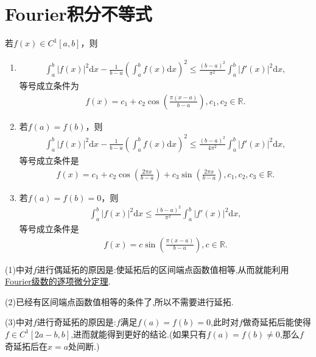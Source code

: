 \documentclass[../../main.tex]{subfiles}
\begin{document}
\section{Fourier积分不等式}

\begin{theorem}[Fourier型积分不等式]\label{theorem:Fourier型积分不等式}
若$f(x)\in C^1[a,b]$，则
\begin{enumerate}[(1)]
\item \begin{align*}
\int_{a}^{b} |f(x)|^2 \mathrm{d}x - \frac{1}{b - a} \left( \int_{a}^{b} f(x) \mathrm{d}x \right)^2 \leqslant  \frac{(b - a)^2}{\pi^2} \int_{a}^{b} |f'(x)|^2 \mathrm{d}x,
\end{align*}
等号成立条件为
\begin{align*}
f(x) = c_1 + c_2 \cos\left( \frac{\pi(x - a)}{b - a} \right), c_1, c_2 \in \mathbb{R}.
\end{align*}

\item 若$f(a) = f(b)$，则
\begin{align*}
\int_{a}^{b} |f(x)|^2 \mathrm{d}x - \frac{1}{b - a} \left( \int_{a}^{b} f(x) \mathrm{d}x \right)^2 \leqslant  \frac{(b - a)^2}{4\pi^2} \int_{a}^{b} |f'(x)|^2 \mathrm{d}x,
\end{align*}
等号成立条件是
\begin{align*}
f(x) = c_1 + c_2 \cos\left( \frac{2\pi x}{b - a} \right) + c_3 \sin\left( \frac{2\pi x}{b - a} \right), c_1, c_2, c_3 \in \mathbb{R}.
\end{align*}

\item 若$f(a) = f(b) = 0$，则
\begin{align*}
\int_{a}^{b} |f(x)|^2 \mathrm{d}x \leqslant  \frac{(b - a)^2}{\pi^2} \int_{a}^{b} |f'(x)|^2 \mathrm{d}x,
\end{align*}
等号成立条件是
\begin{align*}
f(x) = c \sin\left( \frac{\pi (x - a)}{b - a} \right), c \in \mathbb{R}.
\end{align*} 
\end{enumerate}
\end{theorem}
\begin{remark}
(1)中对$f$进行偶延拓的原因是:使延拓后的区间端点函数值相等,从而就能利用\hyperref[theorem:Fourier级数的逐项微分定理]{Fourier级数的逐项微分定理}.

(2)已经有区间端点函数值相等的条件了,所以不需要进行延拓.

(3)中对$f$进行奇延拓的原因是:$f$满足$f(a)=f(b)=0$,此时对$f$做奇延拓后能使得$f\in C^1[2a-b,b]$,进而就能得到更好的结论.(如果只有$f(a)=f(b)\ne0$,那么$f$奇延拓后在$x=a$处间断.)
\end{remark}
\end{document}
